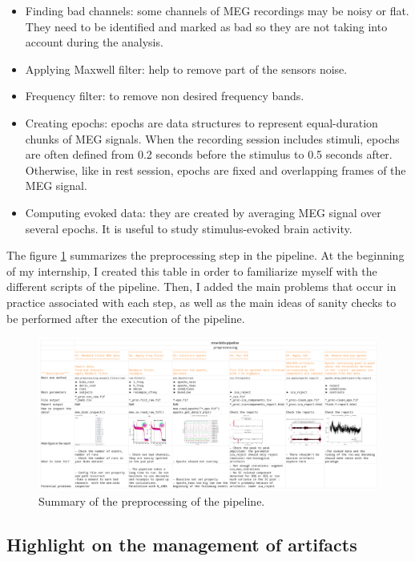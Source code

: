 \begin{itemize}
    \item Finding bad channels: some channels of MEG recordings may be noisy or flat. They need to be identified and marked as bad so they are not taking into account during the analysis.
    \item Applying Maxwell filter: help to remove part of the sensors noise.
    \item Frequency filter: to remove non desired frequency bands.
    \item Creating epochs: epochs are data structures to represent equal-duration chunks of MEG signals. When the recording session includes stimuli, epochs are often defined from 0.2 seconds before the stimulus to 0.5 seconds after. Otherwise, like in rest session, epochs are fixed and overlapping frames of the MEG signal.
    \item Computing evoked data: they are created by averaging MEG signal over several epochs. It is useful to study stimulus-evoked brain activity.
\end{itemize}


The figure \ref{cheat_sheet} summarizes the preprocessing step in the pipeline. At the beginning of my internship, I created this table in order to familiarize myself with the different scripts of the pipeline. Then, I added the main problems that occur in practice associated with each step, as well as the main ideas of sanity checks to be performed after the execution of the pipeline.

\begin{figure}[ht]
    \centering
    \includegraphics[width=15cm]{images_report/preprocessing/cheatsheet preprocessing.png}
    \caption[Summary of the preprocessing of the pipeline.]%
    {Summary of the preprocessing of the pipeline.}
    \label{cheat_sheet}
\end{figure}

\subsection{Highlight on the management of artifacts}
\label{preprocessing_of_artifacts}


